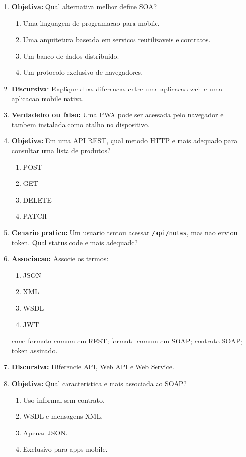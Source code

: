 \documentclass[12pt,a4paper]{article}
\begin{document}
\begin{enumerate}
  \item \textbf{Objetiva:} Qual alternativa melhor define SOA?
  \begin{enumerate}[label=\alph*)]
    \item Uma linguagem de programacao para mobile.
    \item Uma arquitetura baseada em servicos reutilizaveis e contratos.
    \item Um banco de dados distribuido.
    \item Um protocolo exclusivo de navegadores.
  \end{enumerate}

  \item \textbf{Discursiva:} Explique duas diferencas entre uma aplicacao web e uma aplicacao mobile nativa.

  \item \textbf{Verdadeiro ou falso:} Uma PWA pode ser acessada pelo navegador e tambem instalada como atalho no dispositivo.

  \item \textbf{Objetiva:} Em uma API REST, qual metodo HTTP e mais adequado para consultar uma lista de produtos?
  \begin{enumerate}[label=\alph*)]
    \item POST
    \item GET
    \item DELETE
    \item PATCH
  \end{enumerate}

  \item \textbf{Cenario pratico:} Um usuario tentou acessar \texttt{/api/notas}, mas nao enviou token. Qual status code e mais adequado?

  \item \textbf{Associacao:} Associe os termos:
  \begin{enumerate}[label=\roman*)]
    \item JSON
    \item XML
    \item WSDL
    \item JWT
  \end{enumerate}
  com: formato comum em REST; formato comum em SOAP; contrato SOAP; token assinado.

  \item \textbf{Discursiva:} Diferencie API, Web API e Web Service.

  \item \textbf{Objetiva:} Qual caracteristica e mais associada ao SOAP?
  \begin{enumerate}[label=\alph*)]
    \item Uso informal sem contrato.
    \item WSDL e mensagens XML.
    \item Apenas JSON.
    \item Exclusivo para apps mobile.
  \end{enumerate}


\end{enumerate}
\end{document}
